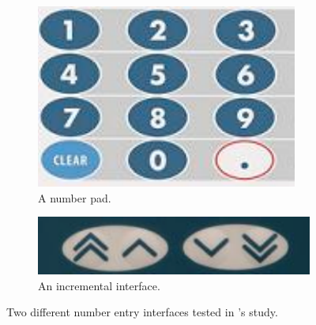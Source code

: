 \begin{figure}[]
\begin{center}

\begin{subfigure}[b]{0.3\textwidth}
\centerline{\includegraphics[scale=0.8]{images/background/numberpad.pdf}}
\caption{A number pad.}
\label{fig:numberpad}
\end{subfigure}
\begin{subfigure}[b]{0.5\textwidth}
\centerline{\includegraphics[scale=0.5]{images/background/incremental.pdf}}
\caption{An incremental interface.}
\label{fig:incremental}
\end{subfigure}

\caption[An incremental and keypad number entry interface.]{Two different number entry interfaces tested in \citeauthor{Oladimeji2011}'s study.}

\label{fig:interface-styles}
\end{center}
\end{figure}


